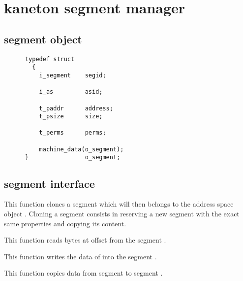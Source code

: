 \section{kaneton segment manager}

\subsection*{segment object}

\begin{verbatim}
      typedef struct
        {
          i_segment    segid;

          i_as         asid;

          t_paddr      address;
          t_psize      size;

          t_perms      perms;

          machine_data(o_segment);
      }                o_segment;
\end{verbatim}

\subsection*{segment interface}

	 {
	   This function clones a segment which will then belongs to
	   the address space object . Cloning a segment
	   consists in reserving a new segment with the
	   exact same properties and copying its content.
	 }

	 {
	   This function reads  bytes at offset
	    from the segment .
	 }

	 {
	   This function writes the data of  into the
	   segment .
	 }

	 {
	   This function copies data from segment  to
	   segment .
	 }

